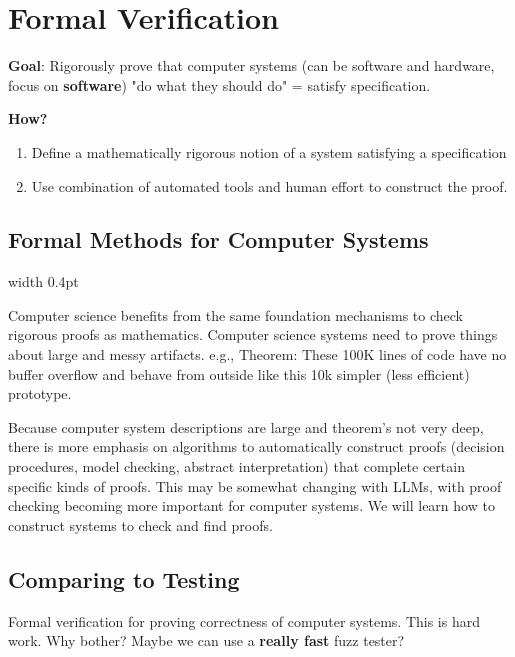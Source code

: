 \documentclass[11pt]{article}
\begin{document}
\section*{Formal Verification}

\textbf{Goal}: Rigorously prove that computer systems (can be software and hardware, focus on \textbf{software}) "do what they should do" = satisfy specification. 

\textbf{How?}
\begin{enumerate}
 	\item Define a mathematically rigorous notion of a system satisfying a specification 
 	\item Use combination of automated tools and human effort to construct the proof.
\end{enumerate}

\subsection*{Formal Methods for Computer Systems}

\noindent
\vrule width 0.4pt
\hspace{0.5em}
\begin{minipage}{0.9\textwidth}
Computer science benefits from the same foundation mechanisms to check rigorous proofs as mathematics. Computer science systems need to prove things about large and messy artifacts. e.g., Theorem: These 100K lines of code have no buffer overflow and behave from outside like this 10k simpler (less efficient) prototype. 

\vspace{0.5cm}

Because computer system descriptions are large and theorem's not very deep, there is more emphasis on algorithms to automatically construct proofs (decision procedures, model checking, abstract interpretation) that complete certain specific kinds of proofs. This may be somewhat changing with LLMs, with proof checking becoming more important for computer systems. We will learn how to construct systems to check and find proofs. 

\end{minipage}
\vspace{0.5cm}

\subsection*{Comparing to Testing}

Formal verification for proving correctness of computer systems. This is hard work. Why bother? Maybe we can use a \textbf{really fast} fuzz tester? 
\end{document}
